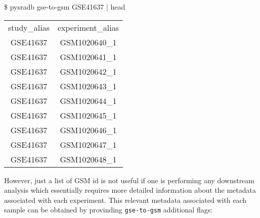 \documentclass[9pt,a4paper]{extarticle}
\newenvironment{allintypewriter}{\ttfamily}{\par}
\begin{document}
\begin{allintypewriter}
\$ pysradb gse-to-gsm GSE41637 | head\\
\begin{table}[H]
    \begin{tabular}{cc}
        study_alias & experiment_alias\\
        GSE41637  &  GSM1020640_1\\
        GSE41637  &  GSM1020641_1\\
        GSE41637  &  GSM1020642_1\\
        GSE41637  &  GSM1020643_1\\
        GSE41637  &  GSM1020644_1\\
        GSE41637  &  GSM1020645_1\\
        GSE41637  &  GSM1020646_1\\
        GSE41637  &  GSM1020647_1\\
        GSE41637  &  GSM1020648_1\\ 
    \end{tabular}
\end{table}

\end{allintypewriter}

However, just a list of GSM id is not useful if one is performing any downstream
analysis which essentially requires more detailed information about the metadata
associated with each experiment. This relevant metadata associated with each sample can be obtained by provinding \texttt{gse-to-gsm} additional flags:
\end{document}
